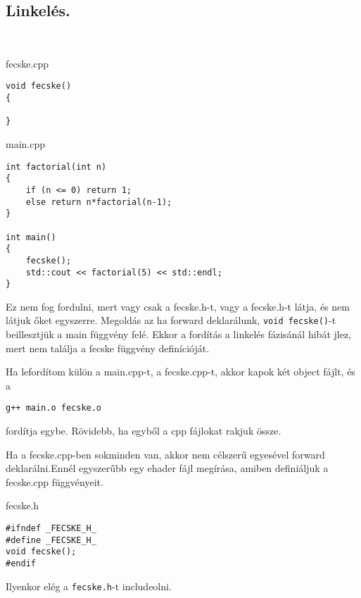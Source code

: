 \documentclass[a4paper,11.5pt]{article}
\begin{document}
	\subsection{Linkelés.}
	\begin{example}\ 
		
		fecske.cpp
		\begin{lstlisting}
void fecske()
{

}
		\end{lstlisting}
		
		main.cpp
		\begin{lstlisting}
int factorial(int n)
{
	if (n <= 0) return 1;
	else return n*factorial(n-1);
}

int main()
{
	fecske();
	std::cout << factorial(5) << std::endl;
}
		\end{lstlisting}
		
		Ez nem fog fordulni, mert vagy csak a fecske.h-t, vagy a fecske.h-t látja, és nem látjuk őket egyszerre. Megoldás az ha forward deklarálunk, \texttt{void fecske()}-t beillesztjük a main függvény felé. Ekkor a fordítás a linkelés fázisánál hibát jlez, mert nem találja a fecske függvény definícióját.
		
		Ha lefordítom külön a main.cpp-t, a fecske.cpp-t, akkor kapok két object fájlt, és a
		
		\texttt{g++ main.o fecske.o}
		
		fordítja egybe. Rövidebb, ha egyből a cpp fájlokat rakjuk össze.
	\end{example}
	Ha a fecske.cpp-ben sokminden van, akkor nem célszerű egyesével forward deklarálni.Ennél egyszerűbb egy ehader fájl megírása, amiben definiáljuk a fecske.cpp függvényeit.
	
	fecske.h
	\begin{lstlisting}
#ifndef _FECSKE_H_
#define _FECSKE_H_
void fecske();
#endif
	\end{lstlisting}
	Ilyenkor elég a \texttt{fecske.h}-t includeolni.
	
\end{document}
